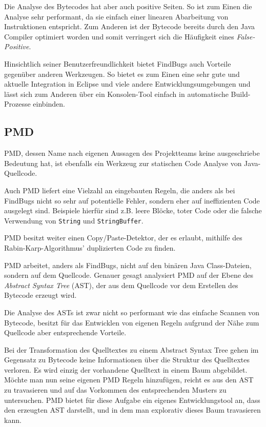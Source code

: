 Die Analyse des Bytecodes hat aber auch positive Seiten. So ist zum Einen die Analyse sehr performant, da sie einfach einer linearen Abarbeitung von Instruktionen entspricht. Zum Anderen ist der Bytecode bereits durch den Java Compiler optimiert worden und somit verringert sich die Häufigkeit eines \textit{False-Positive}.

Hinsichtlich seiner Benutzerfreundlichkeit bietet FindBugs auch Vorteile gegenüber anderen Werkzeugen. So bietet es zum Einen eine sehr gute und aktuelle Integration in Eclipse und viele andere Entwicklungsumgebungen und lässt sich zum Anderen über ein Konsolen-Tool einfach in automatische Build-Prozesse einbinden.


\subsection{PMD}
PMD, dessen Name nach eigenen Aussagen des Projektteams keine ausgeschriebe Bedeutung hat, ist ebenfalls ein Werkzeug zur statischen Code Analyse von Java-Quellcode. 

Auch PMD liefert eine Vielzahl an eingebauten Regeln, die anders als bei FindBugs nicht so sehr auf potentielle Fehler, sondern eher auf ineffizienten Code ausgelegt sind. Beispiele hierfür sind z.B. leere Blöcke, toter Code oder die falsche Verwendung von \verb=String= und \verb=StringBuffer=. 

PMD besitzt weiter einen Copy/Paste-Detektor, der es erlaubt, mithilfe des Rabin-Karp-Algorithmus' duplizierten Code zu finden.

PMD arbeitet, anders als FindBugs, nicht auf den binären Java Class-Dateien, sondern auf dem Quellcode. Genauer gesagt analysiert PMD auf der Ebene des \textit{Abstract Syntax Tree} (AST), der aus dem Quellcode vor dem Erstellen des Bytecode erzeugt wird. 

Die Analyse des ASTs ist zwar nicht so performant wie das einfache Scannen von Bytecode, besitzt für das Entwicklen von eigenen Regeln aufgrund der Nähe zum Quellcode aber entsprechende Vorteile.

Bei der Transformation des Quelltextes zu einem Abstract Syntax Tree gehen im Gegensatz zu Bytecode keine Informationen über die Struktur des Quelltextes verloren. Es wird einzig der vorhandene Quelltext in einem Baum abgebildet. 
Möchte man nun seine eigenen PMD Regeln hinzufügen, reicht es aus den AST zu travasieren und auf das Vorkommen des entsprechenden Musters zu untersuchen. PMD bietet für diese Aufgabe ein eigenes Entwicklungstool an, dass den erzeugten AST darstellt, und in dem man explorativ dieses Baum travasieren kann.

